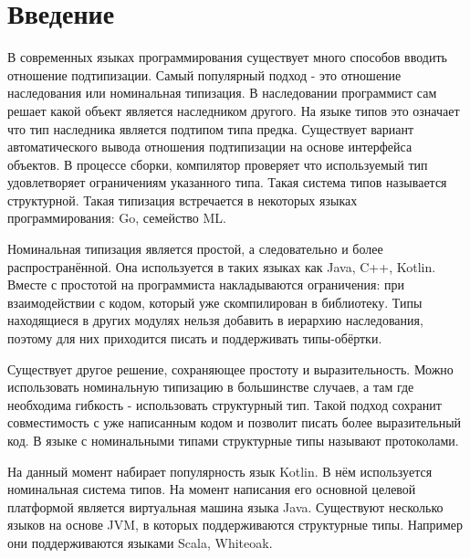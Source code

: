 \section*{Введение}
В современных языках программирования существует много способов вводить отношение подтипизации. Самый популярный подход - это отношение наследования или номинальная типизация. В наследовании программист сам решает какой объект является наследником другого. На языке типов это означает что тип наследника является подтипом типа предка. Существует вариант автоматического вывода отношения подтипизации на основе интерфейса объектов. В процессе сборки, компилятор проверяет что используемый тип удовлетворяет ограничениям указанного типа. Такая система типов называется структурной. Такая типизация встречается в некоторых языках программирования: Go, семейство ML.

Номинальная типизация является простой, а следовательно и более распространённой. Она используется в таких языках как Java, C++, Kotlin. Вместе с простотой на программиста накладываются ограничения: при взаимодействии с кодом, который уже скомпилирован в библиотеку. Типы находящиеся в других модулях нельзя добавить в иерархию наследования, поэтому для них приходится писать и поддерживать типы-обёртки.

Существует другое решение, сохраняющее простоту и выразительность. Можно использовать номинальную типизацию в большинстве случаев, а там где необходима гибкость - использовать структурный тип. Такой подход сохранит совместимость с уже написанным кодом и позволит писать более выразительный код. В языке с номинальными типами структурные типы называют протоколами.

На данный момент набирает популярность язык Kotlin. В нём используется номинальная система типов. На момент написания его основной целевой платформой является виртуальная машина языка Java. Существуют несколько языков на основе JVM, в которых поддерживаются структурные типы. Например они поддерживаются языками Scala, Whiteoak.

